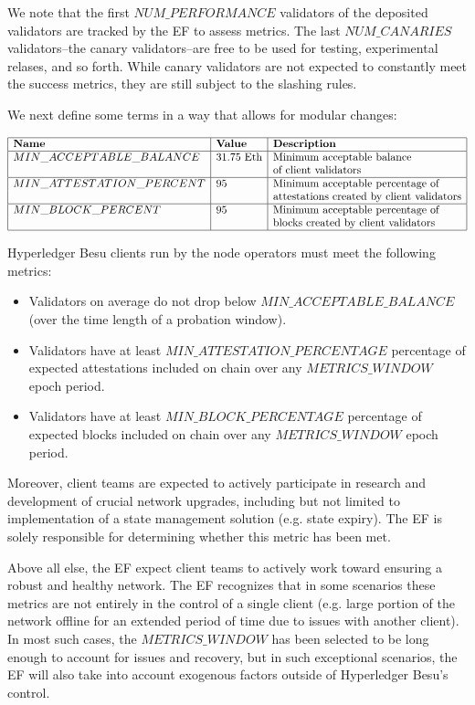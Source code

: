 We note that the first $NUM\_PERFORMANCE$ validators of the deposited validators are tracked by the EF to assess metrics.  The last $NUM\_CANARIES$ validators--the canary validators--are free to be used for testing, experimental relases, and so forth.  While canary validators are not expected to constantly meet the success metrics, they are still subject to the slashing rules.

We next define some terms in a way that allows for modular changes:

\[
\begin{array}{|l|l|l|}
\hline
\textbf{Name} & \textbf{Value} & \textbf{Description} \\
\hline
MIN\_ACCEPTABLE\_BALANCE & 31.75 \text{ Eth} & \text{Minimum acceptable balance} \\
& & \text{of client validators} \\
\hline
MIN\_ATTESTATION\_PERCENT & 95 & \text{Minimum acceptable percentage of} \\
& & \text{attestations created by client validators} \\
\hline
MIN\_BLOCK\_PERCENT & 95 & \text{Minimum acceptable percentage of} \\
& & \text{blocks created by client validators} \\
\hline
\end{array}
\]

Hyperledger Besu clients run by the node operators must meet the following metrics:
\begin{itemize}
\item Validators on average do not drop below $MIN\_ACCEPTABLE\_BALANCE$ (over the time length of a probation window).
\item Validators have at least $MIN\_ATTESTATION\_PERCENTAGE$ percentage of expected attestations included on chain over any $METRICS\_WINDOW$ epoch period.
\item Validators have at least $MIN\_BLOCK\_PERCENTAGE$ percentage of expected blocks included on chain over any $METRICS\_WINDOW$ epoch period.
\end{itemize}

Moreover, client teams are expected to actively participate in research and development of crucial network upgrades, including but not limited to implementation of a state management solution (e.g. state expiry). The EF is solely responsible for determining whether this metric has been met.

Above all else, the EF expect client teams to actively work toward ensuring a robust and healthy network. The EF recognizes that in some scenarios these metrics are not entirely in the control of a single client (e.g. large portion of the network offline for an extended period of time due to issues with another client). In most such cases, the $METRICS\_WINDOW$ has been selected to be long enough to account for issues and recovery, but in such exceptional scenarios, the EF will also take into account exogenous factors outside of Hyperledger Besu’s control.

